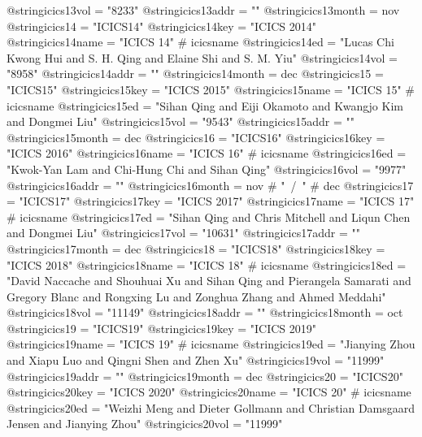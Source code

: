 @string{icics13vol =            "8233"}
@string{icics13addr =           ""}
@string{icics13month =          nov}
@string{icics14 =               "ICICS14"}
@string{icics14key =            "ICICS 2014"}
@string{icics14name =           "ICICS 14" # icicsname}
@string{icics14ed =             "Lucas Chi Kwong Hui and S. H. Qing and Elaine Shi and S. M. Yiu"}
@string{icics14vol =            "8958"}
@string{icics14addr =           ""}
@string{icics14month =          dec}
@string{icics15 =               "ICICS15"}
@string{icics15key =            "ICICS 2015"}
@string{icics15name =           "ICICS 15" # icicsname}
@string{icics15ed =             "Sihan Qing and Eiji Okamoto and Kwangjo Kim and Dongmei Liu"}
@string{icics15vol =            "9543"}
@string{icics15addr =           ""}
@string{icics15month =          dec}
@string{icics16 =               "ICICS16"}
@string{icics16key =            "ICICS 2016"}
@string{icics16name =           "ICICS 16" # icicsname}
@string{icics16ed =             "Kwok-Yan Lam and Chi-Hung Chi and Sihan Qing"}
@string{icics16vol =            "9977"}
@string{icics16addr =           ""}
@string{icics16month =          nov # "~/~" # dec}
@string{icics17 =               "ICICS17"}
@string{icics17key =            "ICICS 2017"}
@string{icics17name =           "ICICS 17" # icicsname}
@string{icics17ed =             "Sihan Qing and Chris Mitchell and Liqun Chen and Dongmei Liu"}
@string{icics17vol =            "10631"}
@string{icics17addr =           ""}
@string{icics17month =          dec}
@string{icics18 =               "ICICS18"}
@string{icics18key =            "ICICS 2018"}
@string{icics18name =           "ICICS 18" # icicsname}
@string{icics18ed =             "David Naccache and Shouhuai Xu and Sihan Qing and Pierangela Samarati and Gregory Blanc and Rongxing Lu and Zonghua Zhang and Ahmed Meddahi"}
@string{icics18vol =            "11149"}
@string{icics18addr =           ""}
@string{icics18month =          oct}
@string{icics19 =               "ICICS19"}
@string{icics19key =            "ICICS 2019"}
@string{icics19name =           "ICICS 19" # icicsname}
@string{icics19ed =             "Jianying Zhou and Xiapu Luo and Qingni Shen and Zhen Xu"}
@string{icics19vol =            "11999"}
@string{icics19addr =           ""}
@string{icics19month =          dec}
@string{icics20 =               "ICICS20"}
@string{icics20key =            "ICICS 2020"}
@string{icics20name =           "ICICS 20" # icicsname}
@string{icics20ed =             "Weizhi Meng and Dieter Gollmann and Christian Damsgaard Jensen and Jianying Zhou"}
@string{icics20vol =            "11999"}
